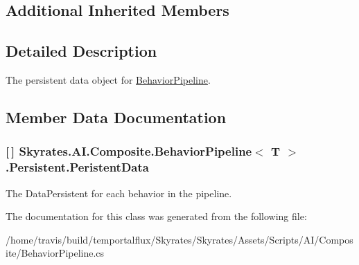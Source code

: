 \subsection*{Additional Inherited Members}


\subsection{Detailed Description}
The persistent data object for \hyperlink{class_skyrates_1_1_a_i_1_1_composite_1_1_behavior_pipeline}{Behavior\-Pipeline}. 



\subsection{Member Data Documentation}
\hypertarget{class_skyrates_1_1_a_i_1_1_composite_1_1_behavior_pipeline_3_01_t_01_4_1_1_persistent_a56f5186e7178555b60d70f4592a43682}{
\subsubsection[{Peristent\-Data}]{ \mbox{[}$\,$\mbox{]} {\bf Skyrates.\-A\-I.\-Composite.\-Behavior\-Pipeline}$<$ T $>$.Persistent.\-Peristent\-Data}}\label{class_skyrates_1_1_a_i_1_1_composite_1_1_behavior_pipeline_3_01_t_01_4_1_1_persistent_a56f5186e7178555b60d70f4592a43682}


The Data\-Persistent for each behavior in the pipeline. 



The documentation for this class was generated from the following file\-:\begin{DoxyCompactItemize}
\item 
/home/travis/build/temportalflux/\-Skyrates/\-Skyrates/\-Assets/\-Scripts/\-A\-I/\-Composite/Behavior\-Pipeline.\-cs\end{DoxyCompactItemize}
